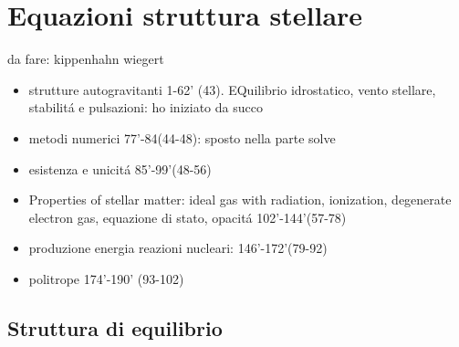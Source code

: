 \section{Equazioni struttura stellare}

\begin{wordonframe}{da fare: kippenhahn wiegert}
\begin{itemize}
\item strutture autogravitanti 1-62' (43). EQuilibrio idrostatico, vento stellare, stabilit\'a e pulsazioni: ho iniziato da succo
\item metodi numerici 77'-84(44-48): sposto nella parte solve
\item esistenza e unicit\'a 85'-99'(48-56)
\item Properties of stellar matter: ideal gas with radiation, ionization, degenerate electron gas, equazione di stato, opacit\'a 102'-144'(57-78)
\item produzione energia reazioni nucleari:  146'-172'(79-92)
\item politrope 174'-190' (93-102)
\end{itemize}
\end{wordonframe}

\subsection{Struttura di equilibrio}

